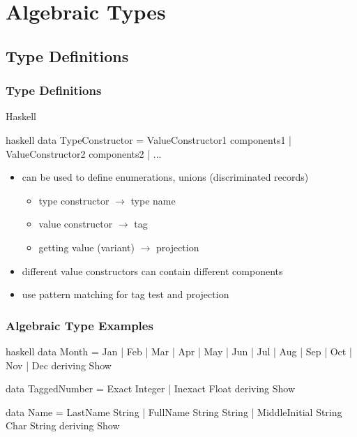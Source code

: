\documentclass[dvipsnames]{beamer}
\theoremstyle{plain}
\begin{document}
\section{Algebraic Types}

\subsection{Type Definitions}

\begin{frame}[fragile]
  \frametitle{Type Definitions}

  \begin{block}{Haskell}
    \begin{pygments}{haskell}
data TypeConstructor = ValueConstructor1 components1
                     | ValueConstructor2 components2
                     | ...
    \end{pygments}
  \end{block}

  \pause
  \begin{itemize}
    \item can be used to define enumerations, unions (discriminated records)
    \begin{itemize}
      \item type constructor $\rightarrow$ type name
      \item value constructor $\rightarrow$ tag
      \item getting value (variant) $\rightarrow$ projection
    \end{itemize}
    \item different value constructors can contain different components
    \item use pattern matching for tag test and projection
  \end{itemize}
\end{frame}

\begin{frame}[fragile]
  \frametitle{Algebraic Type Examples}

  \begin{example}
    \begin{pygments}{haskell}
data Month = Jan | Feb | Mar | Apr | May | Jun
           | Jul | Aug | Sep | Oct | Nov | Dec
           deriving Show

data TaggedNumber = Exact Integer | Inexact Float
                    deriving Show

data Name = LastName String
          | FullName String String
          | MiddleInitial String Char String
          deriving Show
    \end{pygments}
  \end{example}
\end{frame}
\end{document}
